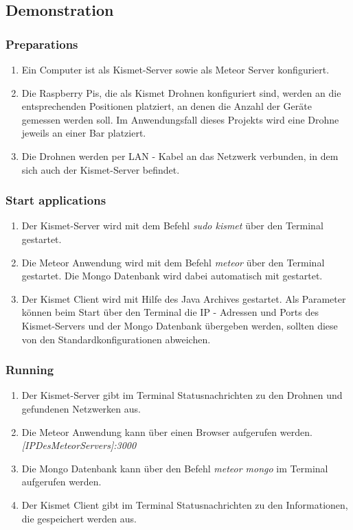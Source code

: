 \documentclass[a4paper]{spie}  %
\begin{document}
\subsection{Demonstration}
\subsubsection{Preparations}
\begin{enumerate}
 \item Ein Computer ist als Kismet-Server sowie als Meteor Server konfiguriert.
 \item Die Raspberry Pis, die als Kismet Drohnen konfiguriert sind, werden an die entsprechenden Positionen platziert, an denen die Anzahl der Geräte gemessen werden soll. Im Anwendungsfall dieses Projekts wird eine Drohne jeweils an einer Bar platziert. 
 \item Die Drohnen werden per LAN - Kabel an das Netzwerk verbunden, in dem sich auch der Kismet-Server befindet.
\end{enumerate}
\subsubsection{Start applications}
\begin{enumerate}
 \item Der Kismet-Server wird mit dem Befehl \emph{sudo kismet} über den Terminal gestartet.
 \item Die Meteor Anwendung wird mit dem Befehl \emph{meteor} über den Terminal gestartet. Die Mongo Datenbank wird dabei automatisch mit gestartet.
 \item Der Kismet Client wird mit Hilfe des Java Archives gestartet. Als Parameter können beim Start über den Terminal die IP - Adressen und Ports des Kismet-Servers und der Mongo Datenbank übergeben werden, sollten diese von den Standardkonfigurationen abweichen.
\end{enumerate}
\subsubsection{Running}
\begin{enumerate}
 \item Der Kismet-Server gibt im Terminal Statusnachrichten zu den Drohnen und gefundenen Netzwerken aus.
 \item Die Meteor Anwendung kann über einen Browser aufgerufen werden. \emph{[IPDesMeteorServers]:3000}
 \item Die Mongo Datenbank kann über den Befehl \emph{meteor mongo} im Terminal aufgerufen werden.
 \item Der Kismet Client gibt im Terminal Statusnachrichten zu den Informationen, die gespeichert werden aus.
\end{enumerate}
\end{document}
